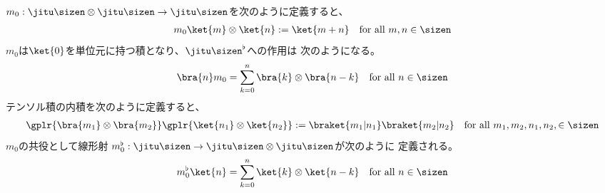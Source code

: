 {	$m_0:\jitu\sizen\otimes\jitu\sizen\to\jitu\sizen$を次のように定義すると、
	\begin{equation*}\begin{split}
		m_0\ket{m}\otimes\ket{n} := \ket{m+n} \quad\text{for all } m,n\in\sizen
	\end{split}\end{equation*}
	$m_0$は$\ket{0}$を単位元に持つ積となり、$\jitu\sizen^\flat$への作用は
	次のようになる。
	\begin{equation*}\begin{split}
		\bra{n}m_0 = \sum_{k=0}^n \bra{k}\otimes\bra{n-k}
		\quad\text{for all } n\in\sizen
	\end{split}\end{equation*}
	テンソル積の内積を次のように定義すると、
	\begin{equation*}\begin{split}
		\gplr{\bra{m_1}\otimes\bra{m_2}}\gplr{\ket{n_1}\otimes\ket{n_2}}
		:= \braket{m_1|n_1}\braket{m_2|n_2}
		\quad\text{for all } m_1,m_2,n_1,n_2,\in\sizen
	\end{split}\end{equation*}
	$m_0$の共役として線形射
	$m_0^\flat:\jitu\sizen\to\jitu\sizen\otimes\jitu\sizen$が次のように
	定義される。
	\begin{equation*}\begin{split}
		m_0^\flat\ket{n} = \sum_{k=0}^n \ket{k}\otimes\ket{n-k}
		\quad\text{for all } n\in\sizen
	\end{split}\end{equation*}

}

